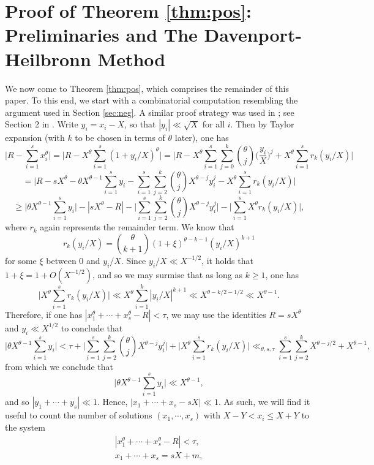 \documentclass[11pt,reqno]{amsart}
\numberwithin{equation}{section}
\begin{document}
\section{Proof of Theorem \ref{thm:pos}: Preliminaries and The Davenport-Heilbronn Method } \label{sec:prelim}

We now come to Theorem \ref{thm:pos}, which comprises the remainder of this paper. To this end, we start with a combinatorial computation resembling the argument used in Section \ref{sec:neg}. A similar proof strategy was used in \cite{DaemenAA1}; see Section 2 in \cite{DaemenAA1}. Write $y_i = x_i-X$, so that $|y_i| \ll \sqrt{X}$ for all $i$. Then by Taylor expansion (with $k$ to be chosen in terms of $\theta$ later), one has 
\[ \Big|R-\sum_{i=1}^s x_i^{\theta}\Big| = \Big|R-X^{\theta}\sum_{i=1}^s (1+y_i/X)^{\theta}\Big| = \Big|R-X^{\theta}\sum_{i=1}^s \sum_{j=0}^k \binom{\theta}{j} \Big(\frac{y_i}{X}\Big)^j+X^{\theta}\sum_{i=1}^s r_k(y_i/X)\Big| \]
\[ = \Big|R-sX^{\theta}-\theta X^{\theta-1}\sum_{i=1}^s y_i -  \sum_{i=1}^s \sum_{j=2}^k \binom{\theta}{j}X^{\theta-j}y_i^j-X^{\theta}\sum_{i=1}^s r_k(y_i/X)\Big| \]
\[ \geq \Big|\theta X^{\theta-1}\sum_{i=1}^s y_i\Big| - |sX^{\theta}-R|-\Big|\sum_{i=1}^s\sum_{j=2}^k \binom{\theta}{j}X^{\theta-j}y_i^j\Big|-\Big|\sum_{i=1}^s X^{\theta}r_k(y_i/X)\Big|, \]
where $r_k$ again represents the remainder term. We know that \[r_k(y_i/X) = \binom{\theta}{k+1}(1+\xi)^{\theta-k-1}(y_i/X)^{k+1}\] 
for some $\xi$ between $0$ and $y_i/X$. Since $y_i/X \ll X^{-1/2}$, it holds that $1 + \xi = 1+O(X^{-1/2})$, and so we may surmise that as long as $k \geq 1$, one has 
\[\Big|X^{\theta}\sum_{i=1}^s r_k(y_i/X)\Big| \ll X^{\theta}\sum_{i=1}^k |y_i/X|^{k+1} \ll X^{\theta-k/2-1/2} \ll X^{\theta-1}.\] 
Therefore, if one has $|x_1^{\theta}+\cdots+x_s^{\theta}-R| < \tau$, we may use the identities $R=sX^{\theta}$ and $y_i \ll X^{1/2}$ to conclude that 
\[ \Big|\theta X^{\theta-1}\sum_{i=1}^s y_i\Big| < \tau +\Big|\sum_{i=1}^s \sum_{j=2}^k \binom{\theta}{j} X^{\theta-j}y_i^j\Big|+\Big|X^{\theta}\sum_{i=1}^s r_k(y_i/X)\Big| \ll_{\theta,s,\tau} \sum_{i=1}^s \sum_{j=2}^k X^{\theta-j/2} + X^{\theta-1}, \]
from which we conclude that 
\[ \Big|\theta X^{\theta-1}\sum_{i=1}^s y_i\Big| \ll X^{\theta-1}, \]
and so $|y_1+\cdots+y_s| \ll 1$. Hence, $|x_1+\cdots+x_s-sX| \ll 1$. As such, we will find it useful to count the number of solutions $(x_1,\cdots,x_s)$ with $X-Y < x_i \leq X+Y$ to the system 
\begin{equation} \label{eq:system}
\begin{aligned}
|x_1^{\theta}+\cdots+x_s^{\theta} - R| < \tau, \\ 
x_1+\cdots+x_s = sX+ m,
\end{aligned}
\end{equation}
\end{document}
